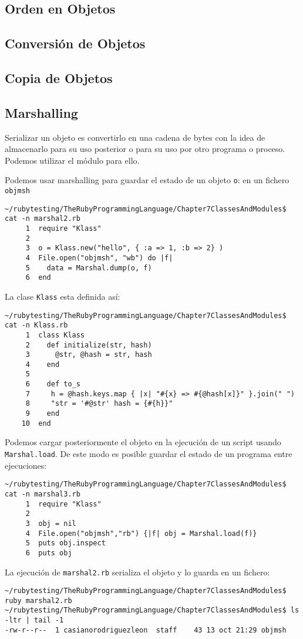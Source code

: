 \subsection{Orden en Objetos}

\subsection{Conversión de Objetos}

\subsection{Copia de Objetos}

\subsection{Marshalling}
Serializar un objeto es convertirlo en una cadena de bytes 
con la idea de almacenarlo para su uso posterior o para
su uso por otro programa o proceso. 
Podemos utilizar el módulo  para ello.

Podemos usar marshalling  para guardar el estado de un objeto \verb|o|:
en un fichero \verb|objmsh|
\begin{verbatim}
~/rubytesting/TheRubyProgrammingLanguage/Chapter7ClassesAndModules$ cat -n marshal2.rb 
     1  require "Klass"
     2  
     3  o = Klass.new("hello", { :a => 1, :b => 2} ) 
     4  File.open("objmsh", "wb") do |f|
     5    data = Marshal.dump(o, f) 
     6  end
\end{verbatim}
La clase \verb|Klass| esta definida así:
\begin{verbatim}
~/rubytesting/TheRubyProgrammingLanguage/Chapter7ClassesAndModules$ cat -n Klass.rb 
     1  class Klass 
     2    def initialize(str, hash)
     3      @str, @hash = str, hash 
     4    end 
     5  
     6    def to_s
     7     h = @hash.keys.map { |x| "#{x} => #{@hash[x]}" }.join(" ")
     8     "str = '#@str' hash = {#{h}}"
     9    end 
    10  end
\end{verbatim}
Podemos cargar posteriormente el objeto
en la ejecución de un script usando \verb|Marshal.load|. 
De este modo es posible guardar el estado de un programa entre ejecuciones:

\begin{verbatim}
~/rubytesting/TheRubyProgrammingLanguage/Chapter7ClassesAndModules$ cat -n marshal3.rb 
     1  require "Klass"
     2  
     3  obj = nil
     4  File.open("objmsh","rb") {|f| obj = Marshal.load(f)}
     5  puts obj.inspect
     6  puts obj
\end{verbatim}
La ejecución de \verb|marshal2.rb| serializa el objeto y lo guarda en un fichero:
\begin{verbatim}
~/rubytesting/TheRubyProgrammingLanguage/Chapter7ClassesAndModules$ ruby marshal2.rb
~/rubytesting/TheRubyProgrammingLanguage/Chapter7ClassesAndModules$ ls -ltr | tail -1
-rw-r--r--  1 casianorodriguezleon  staff    43 13 oct 21:29 objmsh
\end{verbatim}


